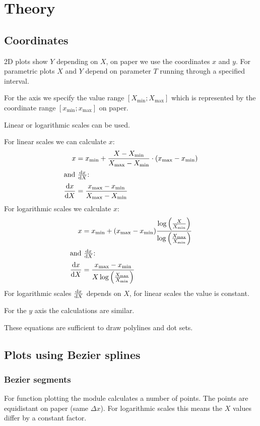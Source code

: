\documentclass[origlongtable]{scrartcl}
\begin{document}
\section{Theory}
\subsection{Coordinates}
2D plots show \(Y\) depending on \(X\), on paper we use the
coordinates \(x\) and \(y\).
For parametric plots \(X\) and \(Y\) depend on parameter \(T\) running
through a specified interval.

For the axis we specify the value range
\([X_{\text{min}};X_{\text{max}}]\) which is represented by the
coordinate range
\([x_{\text{min}};x_{\text{max}}]\) on paper.

Linear or logarithmic scales can be used.

For linear scales we can calculate \(x\):
\begin{align*}
x&=x_{\text{min}}+\frac{X-X_{\text{min}}}{X_{\text{max}}-X_{\text{min}}}\cdot{}(x_{\text{max}}-x_{\text{min}})\\
\intertext{and \(\frac{\mathrm{d}x}{\mathrm{d}X}\):}
\frac{\mathrm{d} x}{\mathrm{d} X}&=\frac{x_{\text{max}}-x_{\text{min}}}{X_{\text{max}}-X_{\text{min}}}\end{align*}
For logarithmic scales we calculate \(x\):
\begin{align*}
x&=x_{\text{min}}+(x_{\text{max}}-x_{\text{min}})\frac{\log{\left(\frac{X}{X_{\text{min}}}\right)}}{\log{\left(\frac{X_{\text{max}}}{X_{\text{min}}}\right)}}\\
\intertext{and \(\frac{\mathrm{d}x}{\mathrm{d}X}\):}
\frac{\mathrm{d} x}{\mathrm{d} X}&=\frac{x_{\text{max}}-x_{\text{min}}}{X\log{\left(\frac{X_{\text{max}}}{X_{\text{min}}}\right)}}
\end{align*}
For logarithmic scales \(\frac{\mathrm{d} x}{\mathrm{d} X}\) depends on \(X\), for
linear scales the value is constant.

For the \(y\) axis the calculations are similar.

These equations are sufficient to draw polylines and dot sets.
\clearpage
\subsection{Plots using Bezier splines}
\subsubsection{Bezier segments}
For function plotting the module calculates a number of points.
The points are equidistant on paper (same \(\Delta x\)). For logarithmic
scales this means the \(X\) values differ by a constant factor.
\end{document}
